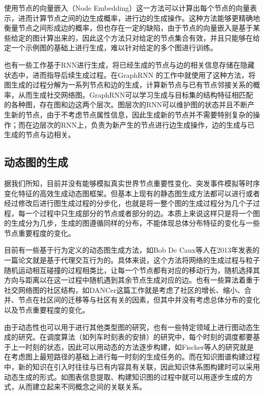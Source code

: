 使用节点的向量嵌入（Node Embedding）这一方法可以计算出每个节点的向量表示，进而计算节点之间的边生成概率，进行边的生成操作。这种方法能够更精确地衡量节点之间形成边的概率，但也存在一定的缺陷，由于节点的向量嵌入是基于某些给定的图计算出来的，因此这个方法只对给定的节点集合有效，并且只能够在给定一个示例图的基础上进行生成，难以针对给定的多个图进行训练。

也有一些工作基于RNN进行生成，将已经生成的节点与边的相关信息存储在隐藏状态中，进而指导后续生成过程。在GraphRNN \cite{You2018GraphRNN} 的工作中就使用了这种方法，将图生成的过程分解为一系列节点和边的生成，计算新节点与已有节点邻接关系的概率，从而生成社交网络图。GraphRNN可以学习生成与目标集的结构特征相匹配的各种图，存在图和边这两个层次。图层次的RNN可以维护图的状态并且不断产生新的节点，由于不考虑节点属性信息，因此生成新的节点并不需要特别复杂的操作；而在边层次的RNN上，负责为新产生的节点进行边生成操作，边的生成与已生成的节点与边相关。

\subsection{动态图的生成}

据我们所知，目前并没有能够模拟真实世界节点重要性变化、突发事件模拟等时序变化特征的高效生成动态图框架\cite{8573573}\cite{DANCer}。但基本上现有的静态图生成方法都可以进行或者经过修改后进行图生成过程的分步化，也就是将一整个图的生成过程分为几个子过程，每一个过程中只生成部分的节点或者部分的边。本质上来说这样只是将一个图的生成分为几步，生成的图遵循同样的分布，不能体现总体分布特征的变化与一些节点重要程度的变化。

目前有一些基于行为定义的动态图生成方法，如Bob De Caux等人在2013年发表的一篇论文\cite{De2014Dynamic}就是基于代理交互行为的。具体来说，这个方法将网络的生成过程与粒子随机运动相互碰撞的过程相类比，让每一个节点都有对应的移动行为，随机选择其方向与距离以在这一过程中随机遇到其余节点生成对应的边。也有一些算法着重于社交网络图的社区结构，如DANCer\cite{DANCer}这篇工作就是考虑了社区的增长、缩小、合并、节点在社区间的迁移等与社区有关的因素，但其中并没有考虑总体分布的变化以及节点重要程度的变化。

由于动态性也可以用于进行其他类型图的研究，也有一些特定领域上进行图动态生成的研究。在调度算法（如列车时刻表的安排）的研究中，每个时刻的调度都要基于上一时刻的状态，因此可以用动态的方法逐步构建，如Fischer等人的研究\cite{Fischer2011Dynamic}就是在考虑图上最短路径的基础上进行每一时刻的生成任务的。而在知识图谱构建过程中，新的知识在引入时往往与已有内容具有关联，因此知识体系图构建时可以采用动态生成的形式。如图表信息提取、构建知识图的过程中就可以用逐步生成的方式\cite{Kim2017Dynamic}，从而建立起来不同概念之间的关联关系。

